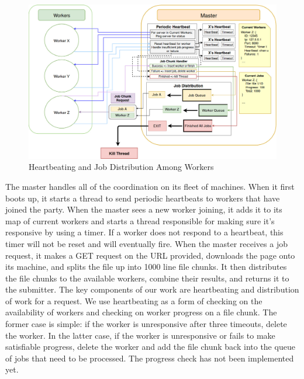 \documentclass[twoside]{article}
\begin{document}
\begin{figure}[h]
\includegraphics[width=\textwidth]{distribution}
    \caption{Heartbeating and Job Distribution Among Workers}
    \label{fig:arch}
\end{figure}

The master handles all of the coordination on its fleet of machines. When it first boots up, it starts a thread to send periodic heartbeats to workers that have joined the party. When the master sees a new worker joining, it adds it to its map of current workers and starts a thread responsible for making sure it's responsive by using a timer. If a worker does not respond to a heartbeat, this timer will not be reset and will eventually fire. When the master receives a job
request, it makes a GET request on the URL provided, downloads the page onto its machine, and splits the file up into 1000 line file chunks. It then distributes the file chunks to the available workers, combine their results, and returns it to the submitter. 
The key components of our work are heartbeating and distribution of work for a request. We use heartbeating as a form of checking on the availability of workers and checking on worker progress on a file chunk. The former case is simple: if the worker is unresponsive after three timeouts, delete the worker. In the latter case, if the worker is unresponsive or fails to make satisfiable progress, delete the worker and add the file chunk back into the queue of jobs that need to be processed.
The progress check has not been implemented yet. 
\\
\end{document}
